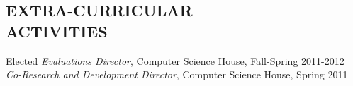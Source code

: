 \documentclass[line,margin]{res}
\begin{document}
\begin{resume}
	 

\section{EXTRA-CURRICULAR \\ ACTIVITIES}             
            Elected {\it Evaluations Director}, Computer Science House, Fall-Spring 2011-2012 \\
	{\it Co-Research and Development Director}, Computer Science House, Spring 2011

 

\end{resume}
\end{document}

